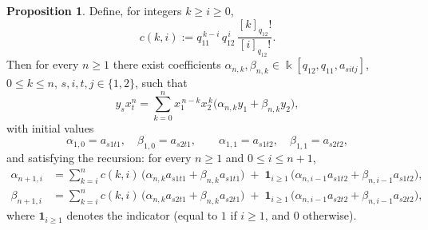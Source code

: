 \documentclass{amsart}
\theoremstyle{definition}
\newtheorem{proposition}[theorem]{Proposition}
\theoremstyle{remark}
\numberwithin{equation}{section}
\begin{document}
\begin{proposition}\label{prop:NF-y1x1n}
Define, for integers $k\ge i\ge0$,
\[
c(k,i):=q_{11}^{\,k-i}\,q_{12}^{\,i}\,\frac{[k]_{q_{12}}!}{[i]_{q_{12}}!}.
\]
Then for every $n\ge1$ there exist coefficients $\alpha_{n,k},\beta_{n,k}\in \Bbbk[q_{12},q_{11},a_{sitj}]$, 
$0\le k\le n$, $s, i, t, j \in \{1,2\}$, such that
\[
y_sx_t^n=\sum_{k=0}^{n} x_1^{\,n-k}x_2^{\,k}\bigl(\alpha_{n,k}y_1+\beta_{n,k}y_2\bigr),
\]
with initial values
\[
\alpha_{1,0}=a_{s1t1},\quad \beta_{1,0}=a_{s2t1},\qquad
\alpha_{1,1}=a_{s1t2},\quad \beta_{1,1}=a_{s2t2},
\]
and satisfying the recursion: for every $n\ge1$ and $0\le i\le n+1$,
\begin{align*}
\alpha_{n+1,i}
&=
\sum_{k=i}^{n} c(k,i)\,\bigl(\alpha_{n,k}a_{s1t1}+\beta_{n,k}a_{s1t1}\bigr)
\;+\;\mathbf{1}_{i\ge 1}\,\bigl(\alpha_{n,i-1}a_{s1t2}+\beta_{n,i-1}a_{s1t2}\bigr),\\
\beta_{n+1,i}
&=
\sum_{k=i}^{n} c(k,i)\,\bigl(\alpha_{n,k}a_{s2t1}+\beta_{n,k}a_{s2t1}\bigr)
\;+\;\mathbf{1}_{i\ge 1}\,\bigl(\alpha_{n,i-1}a_{s2t2}+\beta_{n,i-1}a_{s2t2}\bigr),
\end{align*}
where $\mathbf{1}_{i\ge1}$ denotes the indicator (equal to $1$ if $i\ge1$, and $0$ otherwise).
\end{proposition}
\end{document}
